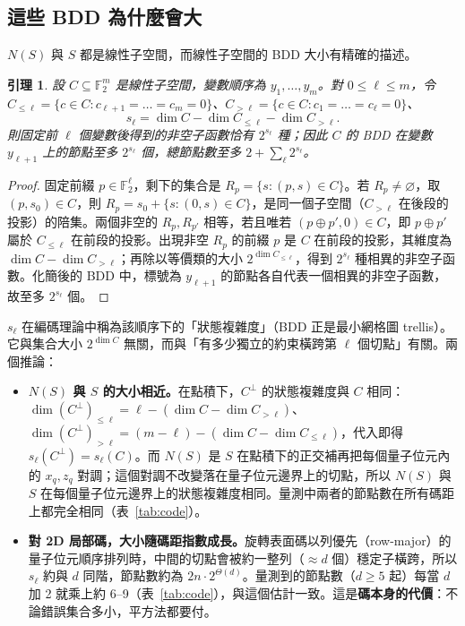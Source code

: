 \documentclass[a4paper,11pt,fontset=none]{ctexart}
\renewcommand{\emph}[1]{\textbf{#1}}
\newcommand{\F}{\mathbb{F}}
\newtheorem{lemma}{引理}
\theoremstyle{definition}
\begin{document}
\subsection{這些 BDD 為什麼會大}

$N(S)$ 與 $S$ 都是線性子空間，而線性子空間的 BDD 大小有精確的描述。

\begin{lemma}\label{lem:width}
設 $C\subseteq\F_2^m$ 是線性子空間，變數順序為 $y_1,\dots,y_m$。對 $0\le\ell\le m$，令 $C_{\le\ell}=\{c\in C:c_{\ell+1}=\dots=c_m=0\}$、$C_{>\ell}=\{c\in C:c_1=\dots=c_\ell=0\}$、
\[
s_\ell=\dim C-\dim C_{\le\ell}-\dim C_{>\ell}.
\]
則固定前 $\ell$ 個變數後得到的非空子函數恰有 $2^{s_\ell}$ 種；因此 $C$ 的 BDD 在變數 $y_{\ell+1}$ 上的節點至多 $2^{s_\ell}$ 個，總節點數至多 $2+\sum_{\ell}2^{s_\ell}$。
\end{lemma}
\begin{proof}
固定前綴 $p\in\F_2^\ell$，剩下的集合是 $R_p=\{s:(p,s)\in C\}$。若 $R_p\neq\varnothing$，取 $(p,s_0)\in C$，則 $R_p=s_0+\{s:(0,s)\in C\}$，是同一個子空間（$C_{>\ell}$ 在後段的投影）的陪集。兩個非空的 $R_p,R_{p'}$ 相等，若且唯若 $(p\oplus p',0)\in C$，即 $p\oplus p'$ 屬於 $C_{\le\ell}$ 在前段的投影。出現非空 $R_p$ 的前綴 $p$ 是 $C$ 在前段的投影，其維度為 $\dim C-\dim C_{>\ell}$；再除以等價類的大小 $2^{\dim C_{\le\ell}}$，得到 $2^{s_\ell}$ 種相異的非空子函數。化簡後的 BDD 中，標號為 $y_{\ell+1}$ 的節點各自代表一個相異的非空子函數，故至多 $2^{s_\ell}$ 個。
\end{proof}

$s_\ell$ 在編碼理論中稱為該順序下的「狀態複雜度」（BDD 正是最小網格圖 trellis）。它與集合大小 $2^{\dim C}$ 無關，而與「有多少獨立的約束橫跨第 $\ell$ 個切點」有關。兩個推論：
\begin{itemize}[leftmargin=1.5em]
\item \textbf{$N(S)$ 與 $S$ 的大小相近。}在點積下，$C^\perp$ 的狀態複雜度與 $C$ 相同：$\dim(C^\perp)_{\le\ell}=\ell-(\dim C-\dim C_{>\ell})$、$\dim(C^\perp)_{>\ell}=(m-\ell)-(\dim C-\dim C_{\le\ell})$，代入即得 $s_\ell(C^\perp)=s_\ell(C)$。而 $N(S)$ 是 $S$ 在點積下的正交補再把每個量子位元內的 $x_q,z_q$ 對調；這個對調不改變落在量子位元邊界上的切點，所以 $N(S)$ 與 $S$ 在每個量子位元邊界上的狀態複雜度相同。量測中兩者的節點數在所有碼距上都完全相同（表~\ref{tab:code}）。
\item \textbf{對 2D 局部碼，大小隨碼距指數成長。}旋轉表面碼以列優先（row-major）的量子位元順序排列時，中間的切點會被約一整列（$\approx d$ 個）穩定子橫跨，所以 $s_\ell$ 約與 $d$ 同階，節點數約為 $2n\cdot2^{\Theta(d)}$。量測到的節點數（$d\ge5$ 起）每當 $d$ 加 2 就乘上約 6--9（表~\ref{tab:code}），與這個估計一致。這是\emph{碼本身的代價}：不論錯誤集合多小，平方法都要付。
\end{itemize}
\end{document}
